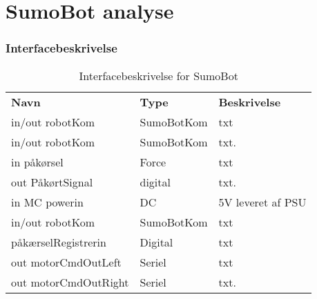 \section{SumoBot analyse}


\subsubsection{Interfacebeskrivelse}

\begin{table*}[]
\centering
    \caption{Interfacebeskrivelse for SumoBot}
    \label{tab:interface_table_SumoBot}
    \begin{tabular}{lp{5cm}p{7cm}}
        \textbf{Navn}              & \textbf{Type}                & \textbf{Beskrivelse}                                                                                                            \\
        in/out robotKom      & SumoBotKom                          & txt                                                                                             \\
        in/out robotKom       & SumoBotKom                         & txt.& 
                 \\
        in påkørsel           & Force                               & txt                                                                                             \\
        out PåkørtSignal      & digital                            & txt.&                                                                                              \\
        in MC powerin        & DC                                   & 5V leveret af PSU 
                 \\
        in/out robotKom      & SumoBotKom                          & txt                                                                                              \\
        påkærselRegistrerin  & Digital                             & txt                                                                                              \\
        out motorCmdOutLeft  & Seriel                               & txt 
                 \\
        out motorCmdOutRight & Seriel                              & txt.&                                                                                          \\

\end{tabular}
\end{table*}
